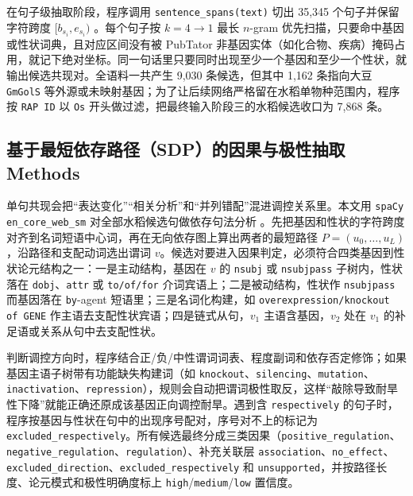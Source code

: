 \documentclass[conference]{IEEEtran}
\begin{document}
在句子级抽取阶段，程序调用 \texttt{sentence\_spans(text)} 切出 35,345 个句子并保留字符跨度 $[b_{s_i}, e_{s_i})$ \cite{slides2026,nltk2009}。每个句子按 $k=4\to 1$ 最长 $n$-gram 优先扫描，只要命中基因或性状词典，且对应区间没有被 PubTator 非基因实体（如化合物、疾病）掩码占用，就记下绝对坐标。同一句话里只要同时出现至少一个基因和至少一个性状，就输出候选共现对。全语料一共产生 9,030 条候选，但其中 1,162 条指向大豆 \texttt{GmGolS} 等外源或未映射基因；为了让后续网络严格留在水稻单物种范围内，程序按 \texttt{RAP ID} 以 \texttt{Os} 开头做过滤，把最终输入阶段三的水稻候选收口为 7,868 条。

\subsection{基于最短依存路径（SDP）的因果与极性抽取 Methods}
单句共现会把“表达变化”“相关分析”和“并列错配”混进调控关系里。本文用 \texttt{spaCy en\_core\_web\_sm} 对全部水稻候选句做依存句法分析 \cite{honnibal2020spacy}。先把基因和性状的字符跨度对齐到名词短语中心词，再在无向依存图上算出两者的最短路径 $P=(u_0,\dots,u_L)$，沿路径和支配动词选出谓词 $v$。候选对要进入因果判定，必须符合四类基因到性状论元结构之一：一是主动结构，基因在 $v$ 的 \texttt{nsubj} 或 \texttt{nsubjpass} 子树内，性状落在 \texttt{dobj}、\texttt{attr} 或 \texttt{to/of/for} 介词宾语上；二是被动结构，性状作 \texttt{nsubjpass} 而基因落在 \texttt{by}-agent 短语里；三是名词化构建，如 \texttt{overexpression/knockout of GENE} 作主语去支配性状宾语；四是链式从句，$v_1$ 主语含基因，$v_2$ 处在 $v_1$ 的补足语或关系从句中去支配性状。

判断调控方向时，程序结合正/负/中性谓词词表、程度副词和依存否定修饰；如果基因主语子树带有功能缺失构建词（如 \texttt{knockout}、\texttt{silencing}、\texttt{mutation}、\texttt{inactivation}、\texttt{repression}），规则会自动把谓词极性取反，这样“敲除导致耐旱性下降”就能正确还原成该基因正向调控耐旱。遇到含 \texttt{respectively} 的句子时，程序按基因与性状在句中的出现序号配对，序号对不上的标记为 \texttt{excluded\_respectively}。所有候选最终分成三类因果（\texttt{positive\_regulation}、\texttt{negative\_regulation}、\texttt{regulation}）、补充关联层 \texttt{association}、\texttt{no\_effect}、\texttt{excluded\_direction}、\texttt{excluded\_respectively} 和 \texttt{unsupported}，并按路径长度、论元模式和极性明确度标上 \texttt{high}/\texttt{medium}/\texttt{low} 置信度。
\end{document}
